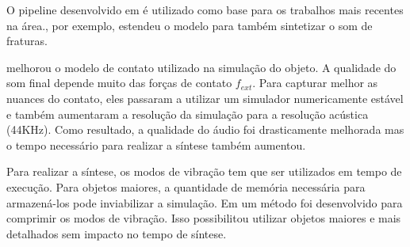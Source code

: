 O pipeline desenvolvido em \cite{james2006precomputed} é utilizado como base para os trabalhos mais recentes na área.\cite{zheng2010rigid}, por exemplo, estendeu o modelo para também sintetizar o som de fraturas.

\cite{zheng2011toward} melhorou o modelo de contato utilizado na simulação do objeto. A qualidade do som final depende muito das forças de contato $f_{ext}$. Para capturar melhor as nuances do contato, eles passaram a utilizar um simulador numericamente estável \cite{kaufman2008staggered} e também aumentaram a resolução da simulação para a resolução acústica (44KHz). Como resultado, a qualidade do áudio foi drasticamente melhorada mas o tempo necessário para realizar a síntese também aumentou.

Para realizar a síntese, os modos de vibração tem que ser utilizados em tempo de execução. Para objetos maiores, a quantidade de memória necessária para armazená-los pode inviabilizar a simulação. Em \cite{langlois2014eigenmode} um método foi desenvolvido para comprimir os modos de vibração. Isso possibilitou utilizar objetos maiores e mais detalhados sem impacto no tempo de síntese. 